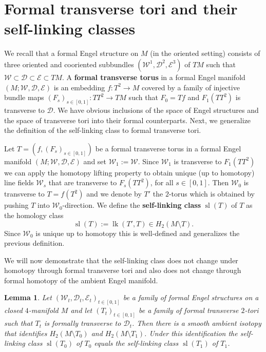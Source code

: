 \documentclass{amsart} %
\DeclareMathOperator{\lk}{lk}
\DeclareMathOperator{\slf}{sl}
\newcommand{\D}{\mathcal{D}}
\newcommand{\E}{\mathcal{E}}
\newcommand{\W}{\mathcal{W}}
\theoremstyle{thm}
\newtheorem{lem}[Theorem]{Lemma}
\theoremstyle{definition}
\begin{document}
\section{Formal transverse tori and their self-linking classes}\label{sec:formal}
We recall that a formal Engel structure on $M$ (in the oriented setting) consists of three oriented and cooriented subbundles $(\W^1,\D^2,\E^3)$ of $TM$ such that $\W\subset\D\subset\E\subset TM$.
A \textbf{formal transverse torus} in a formal Engel manifold $(M;\W,\D,\E)$ is an embedding $f\colon T^2\rightarrow M$ covered by a family of injective bundle maps $(F_s)_{s\in [0,1]}\colon TT^2\rightarrow TM$ such that $F_0=Tf$ and $F_1(TT^2)$ is transverse to $\D$. We have obvious inclusions of the space of Engel structures and the space of transverse tori into their formal counterparts. Next, we generalize the definition of the self-linking class to formal transverse tori.

Let $T=(f,(F_s)_{s\in[0,1]})$ be a formal transverse torus in a formal Engel manifold $(M;\W,\D,\E)$ and set $\W_1:=\W$. Since $\W_1$ is transverse to $F_1(TT^2)$ we can apply the homotopy lifting property to obtain unique (up to homotopy) line fields $\W_s$ that are transverse to $F_s(TT^2)$, for all $s\in[0,1]$. Then $\W_0$ is transverse to $T=f(T^2)$ and we denote by $T'$ the $2$-torus which is obtained by pushing $T$ into $\W_0$-direction. We define the \textbf{self-linking class} $\slf(T)$ of $T$ as the homology class
$$\slf(T):=\lk(T',T)\in H_2(M\setminus T).$$
Since $\W_0$ is unique up to homotopy this is well-defined and generalizes the previous definition.

We will now demonstrate that the self-linking class does not change under homotopy through formal transverse tori and also does not change through formal homotopy of the ambient Engel manifold. 


\begin{lem}
Let $(\W_t,\D_t,\E_t)_{t\in[0,1]}$ be a family of formal Engel structures on a closed $4$-manifold $M$ and let $(T_t)_{t\in[0,1]}$ be a family of formal transverse $2$-tori such that $T_t$ is formally transverse to $\D_t$. Then there is a smooth ambient isotopy that identifies $H_2(M\setminus T_0)$ and $H_2(M\setminus T_1)$. Under this identification the self-linking class $\slf(T_0)$ of $T_0$ equals the self-linking class $\slf(T_1)$ of $T_1$.
\end{lem}
\end{document}
